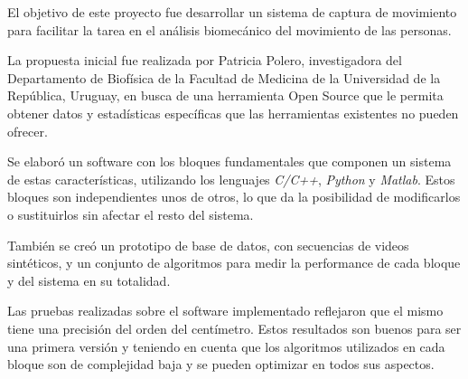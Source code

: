 El objetivo de este proyecto fue desarrollar un sistema de captura de movimiento para facilitar la tarea en el análisis biomecánico del movimiento de las personas.

\vspace{3 mm}

 La propuesta inicial fue realizada por Patricia Polero, investigadora del Departamento de Biofísica de la Facultad de Medicina de la Universidad de la República, Uruguay, en busca de una herramienta Open Source que le permita obtener datos y estadísticas específicas que las herramientas existentes no pueden ofrecer.

\vspace{3 mm}

Se elaboró un software con los bloques fundamentales que componen un sistema de estas características, utilizando los lenguajes \emph{C/C++}, \emph{Python} y \emph{Matlab}. Estos bloques son independientes unos de otros, lo que da la posibilidad de modificarlos o sustituirlos sin afectar el resto del sistema.

\vspace{3 mm}

También se creó un prototipo de base de datos, con secuencias de videos sintéticos, y un conjunto de algoritmos para medir la performance de cada bloque y del sistema en su totalidad.

\vspace{3 mm}

Las pruebas realizadas sobre el software implementado reflejaron que el mismo tiene una precisión del orden del centímetro. Estos resultados son buenos para ser una primera versión y teniendo en cuenta que los algoritmos utilizados en cada bloque son de complejidad baja y se pueden optimizar en todos sus aspectos.
